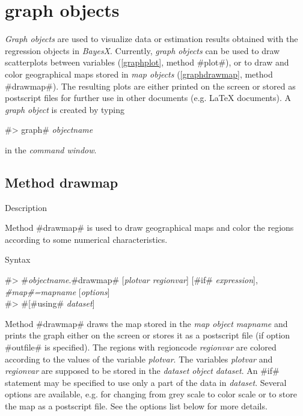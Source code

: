 \chapter{graph objects}
\label{graphobj}  

{\em Graph objects} are used to visualize data or estimation
results obtained with the regression objects in {\em BayesX}.
Currently, {\em graph objects} can be used to draw scatterplots
between variables (\autoref{graphplot}, method #plot#), or to draw
and color geographical maps stored in {\em map objects}
(\autoref{graphdrawmap}, method #drawmap#). The resulting plots
are either printed on the screen or stored as postscript files for
further use in other documents (e.g. \LaTeX\/ documents). A {\em
graph object} is created by typing

#> graph# {\em objectname}

in the {\em command window}.


\clearpage


\section{Method drawmap}
\label{graphdrawmap} 

\begin{stanza}{Description}

Method #drawmap# is used to draw geographical maps and color the
regions according to some numerical characteristics.
\end{stanza}

\begin{stanza}{Syntax}

 #> #{\em objectname}.#drawmap#  [{\em plotvar regionvar}] [#if# {\em expression}], {\em #map#=mapname} [{\em options}]\\
 #> #[#using# {\em dataset}]

Method #drawmap# draws the map stored in the {\em map object} {\em
mapname} and prints the graph either on the screen or stores it as
a postscript file (if option #outfile# is specified). The regions
with regioncode {\em regionvar} are colored according to the
values of the variable {\em plotvar}. The variables {\em plotvar}
and {\em regionvar} are supposed to be stored in the {\em dataset
object} {\em dataset}. An #if# statement may be specified to use
only a part of the data in {\em dataset}. Several options are
available, e.g. for changing from grey scale to color scale or to
store the map as a postscript file. See the options list below for
more details.
\end{stanza}


